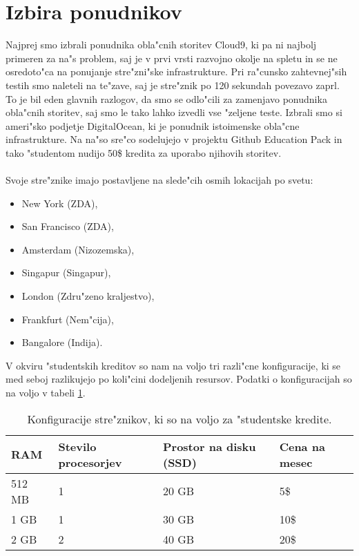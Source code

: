 \section{Izbira ponudnikov}
Najprej smo izbrali ponudnika obla"cnih storitev Cloud9, ki pa ni najbolj primeren za na"s problem, saj je v prvi vrsti razvojno okolje na spletu in se ne osredoto"ca na ponujanje stre"zni"ske infrastrukture. Pri ra"cunsko zahtevnej"sih testih smo naleteli na te"zave, saj je stre"znik po 120 sekundah povezavo zaprl. To je bil eden glavnih razlogov, da smo se odlo"cili za zamenjavo ponudnika obla"cnih storitev, saj smo le tako lahko izvedli vse "zeljene teste. Izbrali smo si ameri"sko podjetje DigitalOcean, ki je ponudnik istoimenske obla"cne infrastrukture. Na na"so sre"co sodelujejo v projektu Github Education Pack in tako "studentom nudijo 50\$ kredita za uporabo njihovih storitev.\\\\Svoje stre"znike imajo postavljene na slede"cih osmih lokacijah po svetu:
\begin{itemize}
\item New York (ZDA),
\item San Francisco (ZDA),
\item Amsterdam (Nizozemska),
\item Singapur (Singapur),
\item London (Zdru"zeno kraljestvo),
\item Frankfurt (Nem"cija),
\item Bangalore (Indija).
\end{itemize}
V okviru "studentskih kreditov so nam na voljo tri razli"cne konfiguracije, ki se med seboj razlikujejo po koli"cini dodeljenih resursov. Podatki o konfiguracijah so na voljo v tabeli \ref{8_table1}.

\begin{table}[!htbp]
  \centering
  \begin{tabular}{ | l | l | l | l | }
    \hline
    RAM & Stevilo procesorjev & Prostor na disku (SSD) & Cena na mesec\\ \hline
    512 MB & 1     & 20 GB &  5\$ \\ \hline
    1 GB & 1 & 30 GB & 10\$ \\ \hline
    2 GB & 2 & 40 GB & 20\$ \\ \hline
  \end{tabular}
  \caption{Konfiguracije stre"znikov, ki so na voljo za "studentske kredite.}
  \label{8_table1}
  \centering
\end{table}




